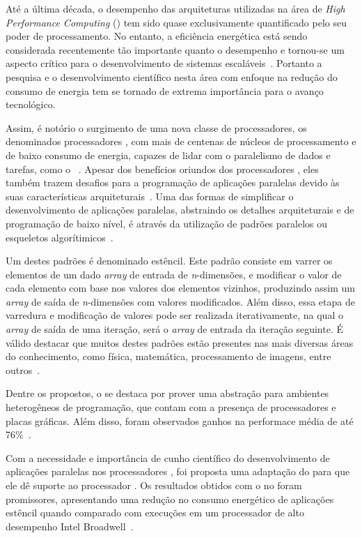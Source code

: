 Até a última década, o desempenho das arquiteturas utilizadas na área de \textit{High Performance Computing} (\hpc) tem sido quase exclusivamente quantificado pelo seu poder de processamento. No entanto, a eficiência energética está sendo considerada recentemente tão importante quanto o desempenho e tornou-se um aspecto crítico para o desenvolvimento de sistemas escaláveis~\cite{francesquini:hal-01092325}. Portanto a pesquisa e o desenvolvimento científico nesta área com enfoque na redução do consumo de energia tem se tornado de extrema importância para o avanço tecnológico.

Assim, é notório o surgimento de uma nova classe de processadores, os denominados processadores \manycore, com mais de centenas de núcleos de processamento e de baixo consumo de energia, capazes de lidar com o paralelismo de dados e tarefas, como o \mppa~\cite{castro2013}. 
Apesar dos benefícios oriundos dos processadores \manycore, eles também trazem desafios para a programação de aplicações paralelas devido às suas características arquiteturais~\cite{castro:hal-01273153}. Uma das formas de simplificar o desenvolvimento de aplicações paralelas, abstraindo os detalhes arquiteturais e de programação de baixo nível, é através da utilização de padrões paralelos ou esqueletos algorítimicos~\cite{COLE2004389}.

Um destes padrões é denominado estêncil. Este padrão consiste em varrer os elementos de um dado \textit{array} de entrada de \textit{n}-dimensões, e modificar o valor de cada elemento com base nos valores dos elementos vizinhos, produzindo assim um \textit{array} de saída de \textit{n}-dimensões com valores modificados. Além disso, essa etapa de varredura e modificação de valores pode ser realizada iterativamente, na qual o \textit{array} de saída de uma iteração, será o \textit{array} de entrada da iteração seguinte. É válido destacar que muitos destes padrões estão presentes nas mais diversas áreas do conhecimento, como física, matemática, processamento de imagens, entre outros~\cite{Holewinski:2012:HCG:2304576.2304619}.

Dentre os \fws propostos, o \pskel se destaca por prover uma abstração para ambientes heterogêneos de programação, que contam com a presença de processadores \multicore e placas gráficas. Além disso, foram observados ganhos na performace média de até 76\%~\cite{CPE:CPE3479}.

Com a necessidade e importância de cunho científico do desenvolvimento de aplicações paralelas nos processadores \manycore, foi proposta uma adaptação do \fw \pskel para que ele dê suporte ao processador \mppa. Os resultados obtidos com o \pskel no \mppa foram promissores, apresentando uma redução no consumo energético de aplicações estêncil quando comparado  com execuções em um processador de alto desempenho Intel Broadwell~\cite{wscad2017}.

